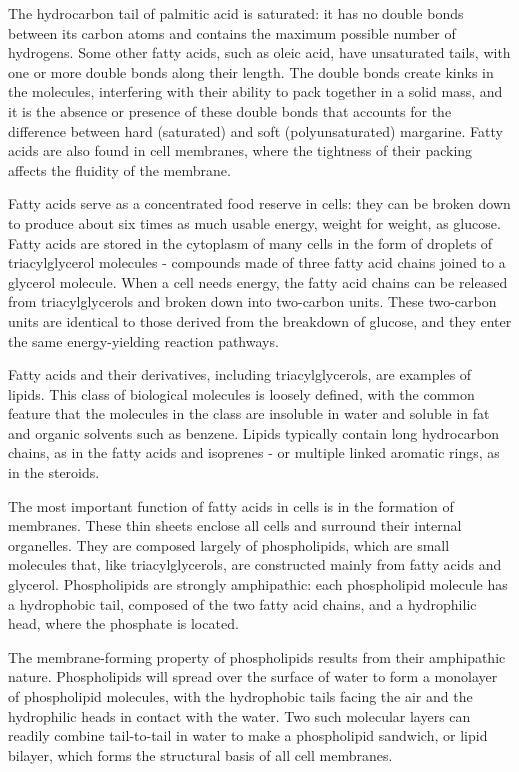 The hydrocarbon tail of palmitic acid is saturated: it has no double bonds
between its carbon atoms and contains the maximum possible number
of hydrogens. Some other fatty acids, such as oleic acid, have
unsaturated tails, with one or more double bonds along their length. The
double bonds create kinks in the molecules, interfering with their ability 
to pack together in a solid mass, and it is the absence or presence of
these double bonds that accounts for the difference between hard (saturated) 
and soft (polyunsaturated) margarine. Fatty acids are also found in
cell membranes, where the tightness of their packing affects the fluidity
of the membrane.

Fatty acids serve as a concentrated food reserve in cells: they can be
broken down to produce about six times as much usable energy, weight
for weight, as glucose. Fatty acids are stored in the cytoplasm of many cells
in the form of droplets of triacylglycerol molecules - compounds made of
three fatty acid chains joined to a glycerol molecule. When a cell needs
energy, the fatty acid chains can be released from triacylglycerols and
broken down into two-carbon units. These two-carbon units are identical
to those derived from the breakdown of glucose, and they enter the same
energy-yielding reaction pathways.

Fatty acids and their derivatives, including triacylglycerols, are examples
of lipids. This class of biological molecules is loosely defined, with the
common feature that the molecules in the class are insoluble in water and
soluble in fat and organic solvents such as benzene. Lipids typically contain
long hydrocarbon chains, as in the fatty acids and isoprenes - or multiple
linked aromatic rings, as in the steroids.

The most important function of fatty acids in cells is in the formation of
membranes. These thin sheets enclose all cells and surround their internal
organelles. They are composed largely of phospholipids, which are small
molecules that, like triacylglycerols, are constructed mainly from fatty
acids and glycerol. Phospholipids are strongly amphipathic: each phospholipid
molecule has a hydrophobic tail, composed of the two fatty acid chains,
and a hydrophilic head, where the phosphate is located.

The membrane-forming property of phospholipids results from their
amphipathic nature. Phospholipids will spread over the surface of water to
form a monolayer of phospholipid molecules, with the hydrophobic tails
facing the air and the hydrophilic heads in contact with the water. Two
such molecular layers can readily combine tail-to-tail in water to make a
phospholipid sandwich, or lipid bilayer, which forms the structural basis
of all cell membranes.

